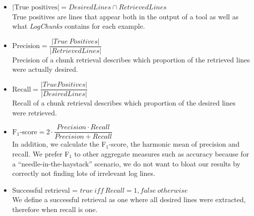 \vspace{0.2cm}
\begin{itemize}[leftmargin=0.4cm] \itemsep1em
	\item $|\mbox{True positives}| = \mathit{DesiredLines} \cap
	\mathit{RetrievedLines}$ \vspace{0.2cm}\\
        True positives are lines that appear both in the output of a
        tool as well as what \textit{LogChunks} contains for each
        example. 
	\item $\mbox{Precision} = \dfrac{|\mathit{True\
	Positives}|}{|\mathit{RetrievedLines}|}$ \vspace{0.21cm} \\
        Precision of a chunk retrieval describes which proportion of
        the retrieved lines were actually desired. 
	\item $\mbox{Recall} =
	\dfrac{|\mathit{TruePositives}|}{|\mathit{DesiredLines}|}$
	\vspace{0.2cm} \\
        Recall of a chunk retrieval describes which proportion of the
        desired lines were retrieved.
	\item $\mbox{F$_{1}$-score} = 2 \cdot \dfrac{\mathit{Precision}
	\cdot \mathit{Recall}}{\mathit{Precision} + \mathit{Recall}}$
	\vspace{0.2cm}\\
        In addition, we calculate the F$_{1}$-score, the harmonic mean
        of precision and recall. We prefer F$_{1}$ to other aggregate
        measures such as accuracy because for a
        ``needle-in-the-haystack'' scenario, we do not want to bloat
        our results by correctly not finding lots of irrelevant log
        lines.
	\item Successful retrieval = $\mathit{true}\ \mathit{iff}\
	\mathit{Recall} = 1, \mathit{false\ otherwise}$  \vspace{0.2cm} \\
	We define a successful retrieval as one where all desired lines were
	extracted, therefore when recall is one.
\end{itemize}


